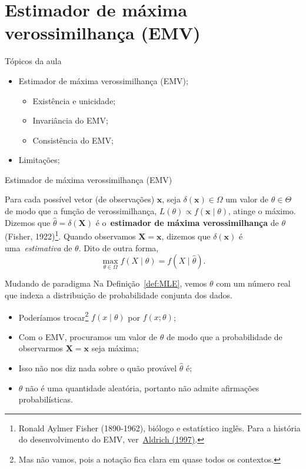 \section*{Estimador de máxima verossimilhança (EMV)}
\begin{frame}{Tópicos da aula}
 \begin{itemize}
  \item Estimador de máxima verossimilhança (EMV);
  \begin{itemize}
     \item Existência e unicidade;
     \item Invariância do EMV;
     \item Consistência do EMV;
  \end{itemize}
  \item Limitações;
 \end{itemize}
\end{frame}

\begin{frame}{Estimador de máxima verossimilhança (EMV)}
 \begin{defn}
 \label{def:MLE}
  Para cada possível vetor (de observações) $\boldsymbol{x}$, seja $\delta(\boldsymbol{x}) \in \Omega$ um valor de $\theta \in \Theta$ de modo que a função de verossimilhança, $L(\theta) \propto f(\boldsymbol{x} \mid \theta)$, atinge o máximo.
  Dizemos que $\hat{\theta} = \delta(\boldsymbol{X})$ é o~\textbf{estimador de máxima verossimilhança} de $\theta$ (Fisher, 1922)\footnote{Ronald Aylmer Fisher (1890-1962), biólogo e estatístico inglês. Para a história do desenvolvimento do EMV, ver~\href{https://projecteuclid.org/euclid.ss/1030037906}{Aldrich (1997)}.}.
  Quando observamos $\boldsymbol{X} = \boldsymbol{x}$, dizemos que $\delta(\boldsymbol{x})$ é uma~\textit{estimativa} de $\theta$.
  Dito de outra forma,
   $$ \max_{\theta \in \Omega} f(X \mid \theta) = f(X\mid \hat{\theta}).$$
 \end{defn}
\end{frame}

\begin{frame}{Mudando de paradigma}
Na Definição~\ref{def:MLE}, vemos $\theta$ com um número real que indexa a distribuição de probabilidade conjunta dos dados.

\begin{itemize}
 \item Poderíamos trocar\footnote{Mas não vamos, pois a notação fica clara em quase todos os contextos.} $f(x \mid \theta)$ por $f(x; \theta)$;
 \item Com o EMV, procuramos um valor de $\theta$ de modo que a probabilidade de observarmos $\boldsymbol{X} = \boldsymbol{x}$ seja máxima;
 \item Isso não nos diz nada sobre o quão provável $\hat{\theta}$ é;
 \item $\theta$ não é uma quantidade aleatória, portanto não admite afirmações probabilísticas.
\end{itemize}
\end{frame}

